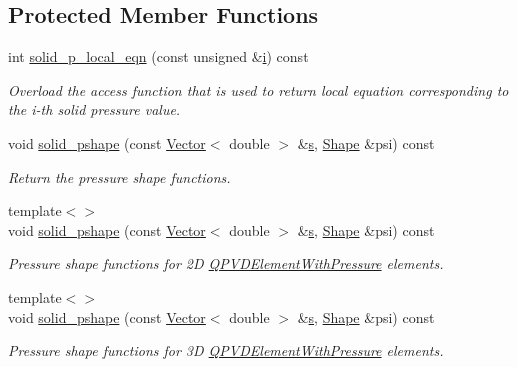 \subsection*{Protected Member Functions}
\begin{DoxyCompactItemize}
\item 
int \hyperlink{classoomph_1_1QPVDElementWithPressure_ad155fc71ac4ba895ffba0924f5a1b687}{solid\+\_\+p\+\_\+local\+\_\+eqn} (const unsigned \&\hyperlink{cfortran_8h_adb50e893b86b3e55e751a42eab3cba82}{i}) const
\begin{DoxyCompactList}\small\item\em Overload the access function that is used to return local equation corresponding to the i-\/th solid pressure value. \end{DoxyCompactList}\item 
void \hyperlink{classoomph_1_1QPVDElementWithPressure_a2775e60c755528c5d8eaf403450f93e2}{solid\+\_\+pshape} (const \hyperlink{classoomph_1_1Vector}{Vector}$<$ double $>$ \&\hyperlink{cfortran_8h_ab7123126e4885ef647dd9c6e3807a21c}{s}, \hyperlink{classoomph_1_1Shape}{Shape} \&psi) const
\begin{DoxyCompactList}\small\item\em Return the pressure shape functions. \end{DoxyCompactList}\item 
{\footnotesize template$<$$>$ }\\void \hyperlink{classoomph_1_1QPVDElementWithPressure_a2138effcaa478d8beebda1f2831fd417}{solid\+\_\+pshape} (const \hyperlink{classoomph_1_1Vector}{Vector}$<$ double $>$ \&\hyperlink{cfortran_8h_ab7123126e4885ef647dd9c6e3807a21c}{s}, \hyperlink{classoomph_1_1Shape}{Shape} \&psi) const
\begin{DoxyCompactList}\small\item\em Pressure shape functions for 2D \hyperlink{classoomph_1_1QPVDElementWithPressure}{Q\+P\+V\+D\+Element\+With\+Pressure} elements. \end{DoxyCompactList}\item 
{\footnotesize template$<$$>$ }\\void \hyperlink{classoomph_1_1QPVDElementWithPressure_a98385eaf0ad482ac7c2781eb32847054}{solid\+\_\+pshape} (const \hyperlink{classoomph_1_1Vector}{Vector}$<$ double $>$ \&\hyperlink{cfortran_8h_ab7123126e4885ef647dd9c6e3807a21c}{s}, \hyperlink{classoomph_1_1Shape}{Shape} \&psi) const
\begin{DoxyCompactList}\small\item\em Pressure shape functions for 3D \hyperlink{classoomph_1_1QPVDElementWithPressure}{Q\+P\+V\+D\+Element\+With\+Pressure} elements. \end{DoxyCompactList}\end{DoxyCompactItemize}
